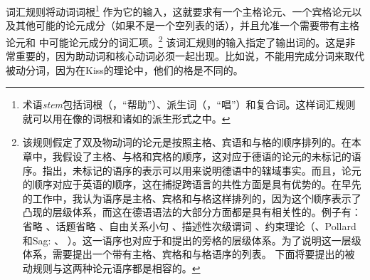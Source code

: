 \addlines
\noindent
词汇规则将动词词根\footnote{
术语\emph{stem}包括词根（，“帮助”）、派生词（，“唱”）和复合词。这样词汇规则就可以用在像的词根和诸如的派生形式之中。
} 作为它的输入，这就要求有一个主格论元、一个宾格论元以及其他可能的论元成分（如果不是一个空列表的话），并且允准一个需要带有主格论元和 中可能论元成分的词汇项。\footnote{
该规则假定了双及物动词的论元是按照主格、宾语和与格的顺序排列的。在本章中，我假设了主格、与格和宾格的顺序，这对应于德语的论元的未标记的语序。\citet{Kiss2001a}指出，未标记的语序的表示可以用来说明德语中的辖域事实。而且，论元的顺序对应于英语的顺序，这在捕捉跨语言的共性方面是具有优势的。在早先的工作中，我认为语序是主格、宾格和与格这样排列的，因为这个顺序表示了凸现的层级体系，而这在德语语法的大部分方面都是具有相关性的。例子有：省略 \citep{Klein85}、话题省略 \citep{Fries88b}、自由关系小句 \citep{Bausewein90,Pittner95b,Mueller99b}、描述性次级谓词 \citep{Mueller2001c,Mueller2002b,Mueller2008a}、约束理论（\citealp{Grewendorf85a}、Pollard和Sag: \citeyear{PS92}、 \citeyear[Chapter~6]{ps2}）。这一语序也对应于\citet{KC77a}和\citet{Pullum77a}提出的旁格的层级体系。为了说明这一层级体系，需要提出一个带有主格、宾格和与格语序的列表。
下面将要提出的被动规则与这两种论元语序都是相容的。
} 该词汇规则的输入指定了输出词的\vformv 。这是非常重要的，因为助动词和核心动词必须一起出现。比如说，不能用完成分词来取代被动分词，因为在Kiss的理论中，他们的格是不同的。
